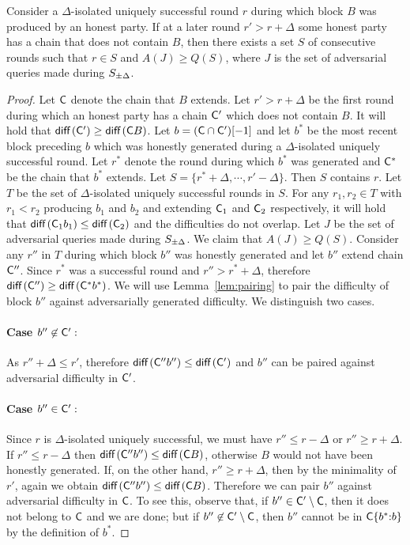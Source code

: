 \begin{lemma}\label{lem:suppression}
  Consider a $\Delta$-isolated uniquely successful round $r$ during which block
  $B$ was produced by an honest party. If at a later round $r' > r + \Delta$
  some honest party has a chain that does not contain $B$, then there exists
  a set $S$ of consecutive rounds such that
  $r \in S$
  and $A(J) \geq Q(S)$, where $J$ is the set of adversarial queries made
  during $S_{\pm\Delta}$.
\end{lemma}
\begin{proof}
  Let $\mathsf{C}$ denote the chain that $B$ extends.
  Let $r' > r + \Delta$ be the first round during which an honest party has a
  chain $\mathsf{C}'$ which does not contain $B$.
  It will hold that $\operatorname{\textsf{diff}\,}(\mathsf{C}') \geq \operatorname{\textsf{diff}\,}(\mathsf{C} B)$.
  Let
  $b = (\mathsf{C} \cap \mathsf{C}')[-1]$ and let $b^*$ be the most recent block
  preceding $b$ which was honestly generated during a $\Delta$-isolated uniquely
  successful round.
  Let $r^*$ denote the round during which $b^*$ was generated
  and $\mathsf{C}^*$ be the chain that $b^*$ extends.
  Let $S = \{r^* + \Delta, \cdots, r' - \Delta\}$.
  Then $S$ contains $r$.
  Let $T$ be the set of $\Delta$-isolated uniquely successful rounds in
  $S$. For any $r_1, r_2 \in T$ with $r_1 < r_2$ producing $b_1$ and $b_2$ and
  extending $\mathsf{C}_1$ and $\mathsf{C}_2$ respectively, it will hold that
  $\operatorname{\textsf{diff}\,}(\mathsf{C}_1 b_1) \leq \operatorname{\textsf{diff}\,}(\mathsf{C}_2)$ and the difficulties do not
  overlap.
  Let $J$ be the set of adversarial queries made during $S_{\pm\Delta}$.
  We claim that $A(J) \geq Q(S)$.
  Consider any $r''$ in $T$
  during which block $b''$ was honestly generated and let $b''$ extend chain $\mathsf{C}''$.
  Since $r^*$ was a successful round and $r'' > r^* + \Delta$, therefore
  $\operatorname{\textsf{diff}\,}(\mathsf{C}'') \geq \operatorname{\textsf{diff}\,}(\mathsf{C}^* b^*)$.
  We will use Lemma~\ref{lem:pairing} to pair the difficulty of block $b''$
  against adversarially generated difficulty.
  We distinguish two cases.
  \paragraph{Case $b'' \not\in \mathsf{C}':$} As $r'' + \Delta \leq r'$, therefore
  $\operatorname{\textsf{diff}\,}(\mathsf{C}''b'') \leq \operatorname{\textsf{diff}\,}(\mathsf{C}')$ and $b''$ can be paired against
  adversarial difficulty in $\mathsf{C}'$.
  \paragraph{Case $b'' \in \mathsf{C}':$}
  Since $r$ is $\Delta$-isolated uniquely successful, we must have
  $r'' \leq r - \Delta$ or $r'' \geq r + \Delta$.
  If $r'' \leq r - \Delta$ then $\operatorname{\textsf{diff}\,}(\mathsf{C}'' b'') \leq \operatorname{\textsf{diff}\,}(\mathsf{C} B)$,
  otherwise $B$ would not have been honestly generated.
  If, on the other hand, $r'' \geq r + \Delta$, then by the minimality of
  $r'$, again we obtain
  $\operatorname{\textsf{diff}\,}(\mathsf{C}'' b'') \leq \operatorname{\textsf{diff}\,}(\mathsf{C} B)$. Therefore we can pair $b''$ against
  adversarial difficulty in $\mathsf{C}$. To see this, observe that, if $b'' \in
  \mathsf{C}'\setminus\mathsf{C}$, then it does not belong to $\mathsf{C}$ and we are done;
  but if $b'' \not\in \mathsf{C}'\setminus\mathsf{C}$, then $b''$ cannot be in
  $\mathsf{C}\{b^*{:}b\}$ by the definition of $b^*$.


\end{proof}
